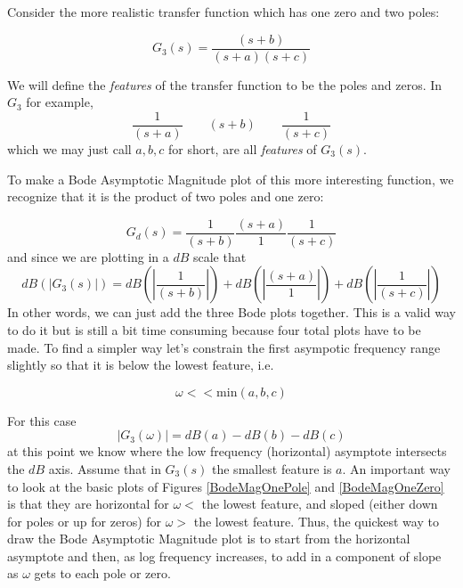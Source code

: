 Consider the more realistic transfer function which has one zero and two poles:

\[
G_3(s) = \frac    {(s+b)} {(s+a)(s+c)}
\]

We will define the {\it features} of the transfer function to be the  poles and zeros.  
In $G_3$ for example, 
\[
\frac {1} {(s+a)} \qquad {(s+b)} \qquad\frac {1} {(s+c)} 
\]
which we may just call $a,b,c$ for short, are all {\it features} of $G_3(s)$.

To make a Bode Asymptotic Magnitude plot of this more interesting function, we recognize that it is the product of two poles and one zero:

\[
G_d(s) = \frac {1} {(s+b)}  \frac {(s+a)} {1}  \frac {1} {(s+c)}
\]
and since we are plotting in a $dB$ scale that
\[
dB(|G_3(s)|) =  dB(\left |\frac {1} {(s+b)}\right |) +   dB(\left |\frac {(s+a)} {1}\right | ) +  dB( \left | \frac {1} {(s+c)}\right |  )
\]
In other words, we can just add the three Bode plots together.   This is a valid way to do it but is still a bit time consuming because four total plots have to be made.   To find a simpler way let's constrain the first asympotic frequency range slightly so that it is below the lowest feature, i.e.

\[
\omega <<  \mathrm{min}(a,b,c)
\]

For this case
\[
|G_3(\omega)| = dB(a) - dB(b)  - dB(c)
\]
at this point we know where the low frequency (horizontal) asymptote intersects the $dB$ axis.
Assume that in $G_3(s)$ the smallest feature is $a$.
An important way to look at the basic plots of Figures \ref{BodeMagOnePole} and \ref{BodeMagOneZero} is that they are horizontal for $\omega < $ the lowest feature, and sloped (either down for poles or up for zeros) for $\omega > $ the lowest feature.   
Thus, the quickest way to draw the Bode Asymptotic Magnitude plot is to start from the horizontal asymptote and then,
as log frequency increases, to add in a component of slope as $\omega$ gets to each pole or zero.



